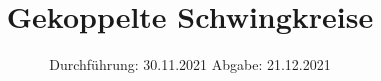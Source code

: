 

\subject{V355}
\title{Gekoppelte Schwingkreise}
\date{
  Durchführung: 30.11.2021
  \hspace{3em}
  Abgabe: 21.12.2021
}



\maketitle
\thispagestyle{empty}
\tableofcontents
\newpage








\printbibliography{}
\nocite{matplotlib}
\nocite{numpy}
\nocite{uncertainties}
\nocite{reback2020pandas}


